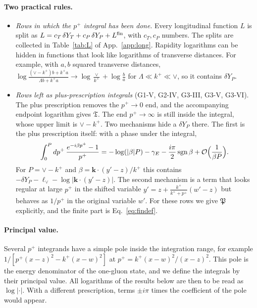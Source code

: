 \documentclass[aps,prd,onecolumn,superscriptaddress,nofootinbib,floatfix,longbibliography,11pt]{revtex4-2}
\numberwithin{equation}{section}
\newcommand{\lV}{\ell_{\vee}}
\newcommand{\Ord}{\mathcal{O}}
\begin{document}
\paragraph*{Two practical rules.}
\begin{itemize}
\item[(A)] \emph{Rows in which the $p^+$ integral has been done.} Every longitudinal function $L$ is split as $L=c_T\,\delta Y_T+c_P\,\delta Y_P+L^{\rm fin}$, with $c_T,c_P$ numbers. The splits are collected in Table~\ref{tab:L} of App.~\ref{app:long}. Rapidity logarithms can be hidden in functions that look like logarithms of transverse distances. For example, with $a,b$ squared transverse distances, $\log\frac{(\vee-k^+)b+k^+a}{\Lambda b+k^+a}\to\log\frac{\vee}{k^+}+\log\frac{b}{a}$ for $\Lambda\ll k^+\ll\vee$, so it contains $\delta Y_P$.
\item[(B)] \emph{Rows left as plus-prescription integrals} (G1-V, G2-IV, G3-III, G3-V, G3-VI). The plus prescription removes the $p^+\to0$ end, and the accompanying endpoint logarithm gives $\mathfrak T$. The end $p^+\to\infty$ is still inside the integral, whose upper limit is $\vee-k^+$. Two mechanisms hide a $\delta Y_P$ there. The first is the plus prescription itself: with a phase under the integral,
\begin{equation}
\int_0^Pdp^+\,\frac{e^{-i\beta p^+}-1}{p^+}=-\log(|\beta|P)-\gamma_E-\frac{i\pi}{2}\,{\rm sgn}\,\beta+\Ord\Big(\frac{1}{\beta P}\Big).
\label{eq:phase}
\end{equation}
For $P=\vee-k^+$ and $\beta=\mathbf k\cdot(y'-z)/k^+$ this contains $-\delta Y_P-\lV-\log|\mathbf k\cdot(y'-z)|$. The second mechanism is a term that looks regular at large $p^+$ in the shifted variable $y'=z+\frac{k^+}{k^++p^+}(w'-z)$ but behaves as $1/p^+$ in the original variable $w'$. For these rows we give $\mathfrak P$ explicitly, and the finite part is Eq.~\eqref{eq:findef}.
\end{itemize}

\paragraph*{Principal value.} Several $p^+$ integrands have a simple pole inside the integration range, for example $1/[p^+(x-z)^2-k^+(x-w)^2]$ at $p^+=k^+(x-w)^2/(x-z)^2$. This pole is the energy denominator of the one-gluon state, and we define the integrals by their principal value. All logarithms of the results below are then to be read as $\log|\cdot|$. With a different prescription, terms $\pm i\pi$ times the coefficient of the pole would appear.
\end{document}
